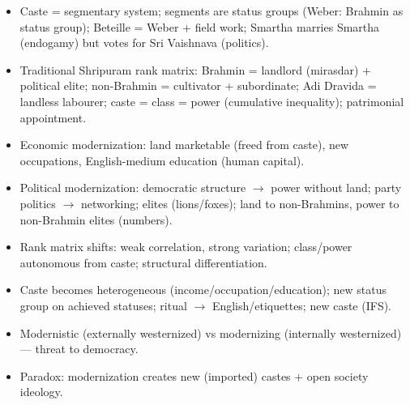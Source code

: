 \begin{QuickRevision}
\begin{itemize}
\item Caste = segmentary system; segments are status groups (Weber: Brahmin as status group); Beteille = Weber + field work; Smartha marries Smartha (endogamy) but votes for Sri Vaishnava (politics).
\item Traditional Shripuram rank matrix: Brahmin = landlord (mirasdar) + political elite; non-Brahmin = cultivator + subordinate; Adi Dravida = landless labourer; caste = class = power (cumulative inequality); patrimonial appointment.
\item Economic modernization: land marketable (freed from caste), new occupations, English-medium education (human capital).
\item Political modernization: democratic structure $\rightarrow$ power without land; party politics $\rightarrow$ networking; elites (lions/foxes); land to non-Brahmins, power to non-Brahmin elites (numbers).
\item Rank matrix shifts: weak correlation, strong variation; class/power autonomous from caste; structural differentiation.
\item Caste becomes heterogeneous (income/occupation/education); new status group on achieved statuses; ritual $\rightarrow$ English/etiquettes; new caste (IFS).
\item Modernistic (externally westernized) vs modernizing (internally westernized) --- threat to democracy.
\item Paradox: modernization creates new (imported) castes + open society ideology.
\end{itemize}
\end{QuickRevision}


